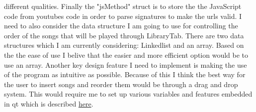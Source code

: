 \documentclass{article}
\begin{document}
different qualities.
Finally the "jsMethod" struct is to store the the JavaScript code from youtubes code in
order to parse signatures to make the urls valid.
I need to also consider the data structure I am going to use for controlling the order of
the songs that will be played through LibraryTab. There are two data structures which
I am currently considering: Linkedlist and an array.%
Based on the the ease of use I
belive that the easier and more efficient option would be to use an array.
Another key design feature I need to implement is making the use of the program as
intuitive as possible. Because of this I think the best way for the user to insert
songs and reorder them would be through a drag and drop system. This would require
me to set up various variables and features embedded in qt which is described
\href{http://doc.qt.io/qt-5/model-view-programming.html#using-drag-and-drop-with-item-views}
{here}.
\end{document}
